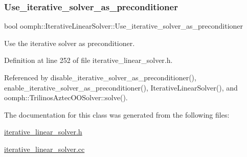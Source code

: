 \mbox{\label{classoomph_1_1IterativeLinearSolver_a10af0af774e98543b7ecd6a563018ff8}} 
\subsubsection{\texorpdfstring{Use\+\_\+iterative\+\_\+solver\+\_\+as\+\_\+preconditioner}{Use\_iterative\_solver\_as\_preconditioner}}
{\footnotesize\ttfamily bool oomph\+::\+Iterative\+Linear\+Solver\+::\+Use\+\_\+iterative\+\_\+solver\+\_\+as\+\_\+preconditioner\hspace{0.3cm}{\ttfamily [protected]}}



Use the iterative solver as preconditioner. 



Definition at line 252 of file iterative\+\_\+linear\+\_\+solver.\+h.



Referenced by disable\+\_\+iterative\+\_\+solver\+\_\+as\+\_\+preconditioner(), enable\+\_\+iterative\+\_\+solver\+\_\+as\+\_\+preconditioner(), Iterative\+Linear\+Solver(), and oomph\+::\+Trilinos\+Aztec\+O\+O\+Solver\+::solve().



The documentation for this class was generated from the following files\+:\begin{DoxyCompactItemize}
\item 
\hyperlink{iterative__linear__solver_8h}{iterative\+\_\+linear\+\_\+solver.\+h}\item 
\hyperlink{iterative__linear__solver_8cc}{iterative\+\_\+linear\+\_\+solver.\+cc}\end{DoxyCompactItemize}
